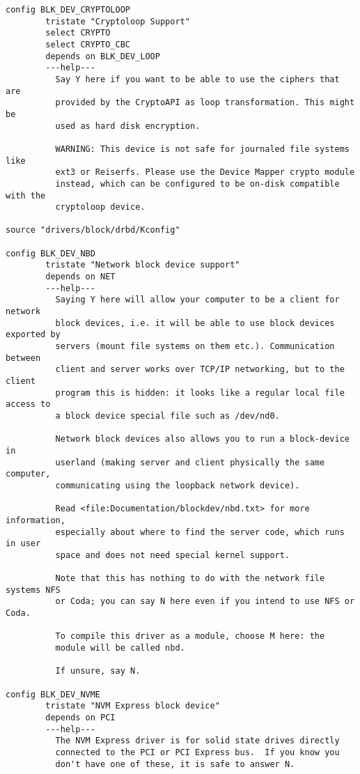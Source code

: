 \documentclass[journal,10pt,onecolumn,compsoc,letterpaper,draftclsnofoot,table,xcdraw]{IEEEtran} \usepackage[margin=0.75in]{geometry}
\begin{document}
\begin{verbatim}
config BLK_DEV_CRYPTOLOOP
        tristate "Cryptoloop Support"
        select CRYPTO
        select CRYPTO_CBC
        depends on BLK_DEV_LOOP
        ---help---
          Say Y here if you want to be able to use the ciphers that are
          provided by the CryptoAPI as loop transformation. This might be
          used as hard disk encryption.

          WARNING: This device is not safe for journaled file systems like
          ext3 or Reiserfs. Please use the Device Mapper crypto module
          instead, which can be configured to be on-disk compatible with the
          cryptoloop device.

source "drivers/block/drbd/Kconfig"

config BLK_DEV_NBD
        tristate "Network block device support"
        depends on NET
        ---help---
          Saying Y here will allow your computer to be a client for network
          block devices, i.e. it will be able to use block devices exported by
          servers (mount file systems on them etc.). Communication between
          client and server works over TCP/IP networking, but to the client
          program this is hidden: it looks like a regular local file access to
          a block device special file such as /dev/nd0.

          Network block devices also allows you to run a block-device in
          userland (making server and client physically the same computer,
          communicating using the loopback network device).

          Read <file:Documentation/blockdev/nbd.txt> for more information,
          especially about where to find the server code, which runs in user
          space and does not need special kernel support.

          Note that this has nothing to do with the network file systems NFS
          or Coda; you can say N here even if you intend to use NFS or Coda.

          To compile this driver as a module, choose M here: the
          module will be called nbd.

          If unsure, say N.

config BLK_DEV_NVME
        tristate "NVM Express block device"
        depends on PCI
        ---help---
          The NVM Express driver is for solid state drives directly
          connected to the PCI or PCI Express bus.  If you know you
          don't have one of these, it is safe to answer N.


\end{verbatim}
\end{document}
